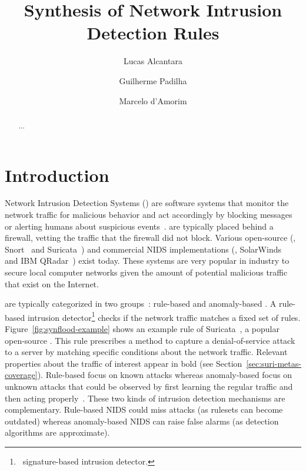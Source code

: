 \documentclass[runningheads]{llncs}
\begin{document}
%
\title{Synthesis of Network Intrusion Detection Rules}
%
%
\author{Lucas Alcantara \and
Guilherme Padilha \and
Marcelo d'Amorim}
%
%
%
\maketitle              %
%
\begin{abstract}
...
\end{abstract}
%
%
%
\section{Introduction}

Network Intrusion Detection Systems (\nids{}) are software systems
that monitor the network traffic for malicious behavior and act
accordingly by blocking messages or alerting humans about suspicious
events~\cite{Mitchell:2014:SID:2597757.2542049}. \nids{} are typically
placed behind a firewall, vetting the traffic that the firewall did
not block. Various open-source (\eg{}, Snort~\cite{snort} and
Suricata~\cite{suricata}) and commercial NIDS implementations (\eg{},
SolarWinds~\cite{solarwinds} and IBM QRadar~\cite{qradar}) exist
today. These systems are very popular in industry to secure local
computer networks given the amount of potential malicious traffic that
exist on the Internet.

\sloppy \nids{} are typically categorized in two
groups~\cite{kumar2007survey}: rule-based and anomaly-based \nids. A
rule-based intrusion detector\footnote{\aka\ signature-based intrusion
  detector.} checks if the network traffic matches a fixed set of
rules. Figure~\ref{fig:synflood-example} shows an example rule of
Suricata~\cite{suricata}, a popular open-source \nids{}. This rule
prescribes a method to capture a denial-of-service
attack~\cite{understanding-dos} to a server by matching specific
conditions about the network traffic. Relevant properties about the
traffic of interest appear in bold (see
Section~\ref{sec:suri-metas-coverage}). Rule-based \nids{} focus on
known attacks whereas anomaly-based \nids{} focus on unknown attacks
that could be observed by first learning the regular traffic and then
acting
properly~\cite{kumar2007survey,Mitchell:2014:SID:2597757.2542049,cordy-etal-issta19}. These
two kinds of intrusion detection mechanisms are
complementary. Rule-based NIDS could miss attacks (as rulesets can
become outdated) whereas anomaly-based NIDS can raise false alarms (as
detection algorithms are approximate).
\end{document}
